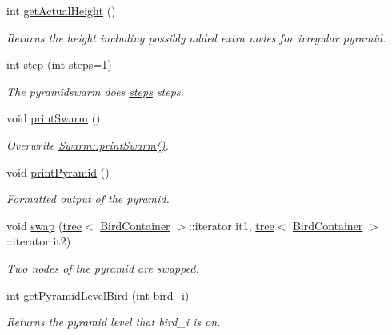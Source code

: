 \begin{CompactItemize}
int \hyperlink{classPyramidSwarm_651f505aa4513559e87f2481ea259443}{getActualHeight} ()
\begin{CompactList}\small\item\em Returns the height including possibly added extra nodes for irregular pyramid. \item\end{CompactList}\item 
int \hyperlink{classPyramidSwarm_a9a21f0581b43dc3549fee12d6f2229e}{step} (int \hyperlink{runpso_8cpp_b4ae7205573977222eadd0795db193e2}{steps}=1)
\begin{CompactList}\small\item\em The pyramidswarm does \hyperlink{runpso_8cpp_b4ae7205573977222eadd0795db193e2}{steps} steps. \item\end{CompactList}\item 
void \hyperlink{classPyramidSwarm_85ec37731cf16f817ae7523e890a267e}{printSwarm} ()
\begin{CompactList}\small\item\em Overwrite \hyperlink{classSwarm_3e480dd422f3babe42d22d5af097c2ba}{Swarm::printSwarm()}. \item\end{CompactList}\item 
void \hyperlink{classPyramidSwarm_6c186db55b8f8b65b5a598c6a45ae72e}{printPyramid} ()
\begin{CompactList}\small\item\em Formatted output of the pyramid. \item\end{CompactList}\item 
void \hyperlink{classPyramidSwarm_c6d4a660c91549b01bb868f29a3570a9}{swap} (\hyperlink{classtree}{tree}$<$ \hyperlink{structBirdContainer}{BirdContainer} $>$::iterator it1, \hyperlink{classtree}{tree}$<$ \hyperlink{structBirdContainer}{BirdContainer} $>$::iterator it2)
\begin{CompactList}\small\item\em Two nodes of the pyramid are swapped. \item\end{CompactList}\item 
int \hyperlink{classPyramidSwarm_756af67d13a153ab3d2581673733b474}{getPyramidLevelBird} (int bird\_\-i)
\begin{CompactList}\small\item\em Returns the pyramid level that bird\_\-i is on. \item\end{CompactList}\item 

\end{CompactItemize}
